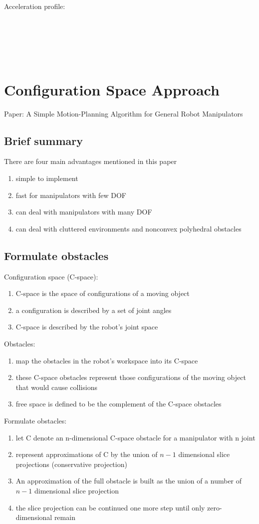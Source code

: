 \documentclass[12pt]{article}
\begin{document}
Acceleration profile:\\\\\\\\\\\\

\section{Configuration Space Approach}
Paper: A Simple Motion-Planning Algorithm for General Robot Manipulators
\subsection{Brief summary}
There are four main advantages mentioned in this paper
\begin{enumerate}
  \item simple to implement
  \item fast for manipulators with few DOF
  \item can deal with manipulators with many DOF
  \item can deal with cluttered environments and nonconvex polyhedral obstacles
\end{enumerate}
\subsection{Formulate obstacles}
Configuration space (C-space):
\begin{enumerate}
  \item C-space is the space of configurations of a moving object
  \item a configuration is described by a set of joint angles
  \item C-space is described by the robot's joint space
\end{enumerate}
Obstacles:
\begin{enumerate}
  \item map the obstacles in the robot's workspace into its C-space
  \item these C-space obstacles represent those configurations of the moving object that would cause collisions
  \item free space is defined to be the complement of the C-space obstacles
\end{enumerate}
Formulate obstacles:
\begin{enumerate}
  \item let C denote an n-dimensional C-space obstacle for a manipulator with n joint
  \item represent approximations of C by the union of $n-1$ dimensional slice projections (conservative projection)
  \item An approximation of the full obstacle is built as the union of a number of $n-1$ dimensional slice projection
  \item the slice projection can be continued one more step until only zero-dimensional remain
\end{enumerate}
\end{document}

